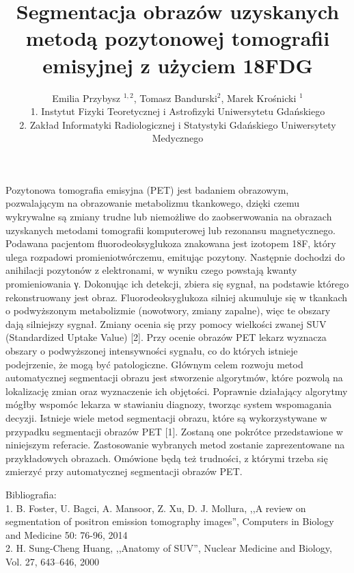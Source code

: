 \documentclass[12pt, a4paper]{article}
\begin{document}
\title{Segmentacja obrazów uzyskanych metodą pozytonowej tomografii emisyjnej z użyciem 18FDG}
\author{Emilia Przybysz $^{1,2}$, Tomasz Bandurski$^2$, Marek Krośnicki $^1$\\1. Instytut Fizyki Teoretycznej i Astrofizyki Uniwersytetu Gdańskiego\\
2. Zakład Informatyki Radiologicznej i Statystyki Gdańskiego Uniwersytety Medycznego}
\date {}
\maketitle
\thispagestyle{title}
Pozytonowa tomografia emisyjna (PET) jest badaniem obrazowym, pozwalającym na
obrazowanie metabolizmu tkankowego, dzięki czemu wykrywalne są zmiany trudne lub niemożliwe do  zaobserwowania na obrazach uzyskanych metodami tomografii komputerowej lub rezonansu magnetycznego. 
Podawana pacjentom fluorodeoksyglukoza znakowana jest izotopem 18F, który ulega rozpadowi promieniotwórczemu, emitując pozytony. Następnie dochodzi do anihilacji pozytonów z elektronami, w wyniku czego powstają kwanty promieniowania γ. Dokonując ich detekcji, zbiera się sygnał, na podstawie którego rekonstruowany jest obraz. Fluorodeoksyglukoza silniej akumuluje się w tkankach o podwyższonym metabolizmie (nowotwory, zmiany zapalne), więc te obszary dają silniejszy sygnał. Zmiany ocenia się przy pomocy wielkości zwanej SUV (Standardized Uptake Value) [2]. 
Przy ocenie obrazów PET lekarz wyznacza obszary o podwyższonej  intensywności sygnału, co do których istnieje podejrzenie, że mogą być patologiczne. Głównym celem rozwoju metod automatycznej segmentacji obrazu jest stworzenie algorytmów, które pozwolą na lokalizację zmian oraz wyznaczenie ich objętości. Poprawnie działający algorytmy mógłby wspomóc lekarza w stawianiu diagnozy, tworząc system wspomagania decyzji.
Istnieje wiele metod segmentacji obrazu, które są wykorzystywane w przypadku segmentacji 
obrazów PET [1]. Zostaną one pokrótce przedstawione w niniejszym referacie. Zastosowanie wybranych metod zostanie zaprezentowane na przykładowych obrazach. Omówione będą też trudności, z którymi trzeba się zmierzyć przy automatycznej segmentacji obrazów PET.

Bibliografia: \\
1. B. Foster, U. Bagci, A. Mansoor, Z. Xu, D. J. Mollura, ,,A review on segmentation of positron emission tomography images”, Computers in Biology and Medicine 50: 76-96, 2014\\
2. H. Sung-Cheng Huang, ,,Anatomy of SUV”, Nuclear Medicine and Biology, Vol. 27, 643–646, 2000
\end{document}
